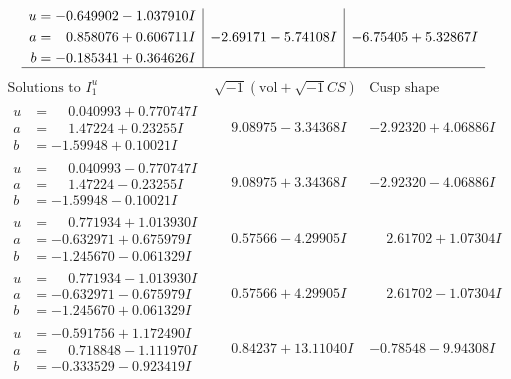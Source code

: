 \documentclass[1p]{elsarticle_modified}
\theoremstyle{definition}
\newcommand{\I}{\sqrt{-1}}
\begin{document}
$$\begin{array}{c|c|c}
\begin{aligned}
u &= -0.649902 - 1.037910 I \\
a &= \phantom{-}0.858076 + 0.606711 I \\
b &= -0.185341 + 0.364626 I\end{aligned}
 & -2.69171 - 5.74108 I & -6.75405 + 5.32867 I\\
 \hline 
 \end{array}$$\newpage$$\begin{array}{c|c|c}  
\text{Solutions to }I^u_{1}& \I (\text{vol} + \sqrt{-1}CS) & \text{Cusp shape}\\
 \hline 
\begin{aligned}
u &= \phantom{-}0.040993 + 0.770747 I \\
a &= \phantom{-}1.47224 + 0.23255 I \\
b &= -1.59948 + 0.10021 I\end{aligned}
 & \phantom{-}9.08975 - 3.34368 I & -2.92320 + 4.06886 I \\ \hline\begin{aligned}
u &= \phantom{-}0.040993 - 0.770747 I \\
a &= \phantom{-}1.47224 - 0.23255 I \\
b &= -1.59948 - 0.10021 I\end{aligned}
 & \phantom{-}9.08975 + 3.34368 I & -2.92320 - 4.06886 I \\ \hline\begin{aligned}
u &= \phantom{-}0.771934 + 1.013930 I \\
a &= -0.632971 + 0.675979 I \\
b &= -1.245670 - 0.061329 I\end{aligned}
 & \phantom{-}0.57566 - 4.29905 I & \phantom{-}2.61702 + 1.07304 I \\ \hline\begin{aligned}
u &= \phantom{-}0.771934 - 1.013930 I \\
a &= -0.632971 - 0.675979 I \\
b &= -1.245670 + 0.061329 I\end{aligned}
 & \phantom{-}0.57566 + 4.29905 I & \phantom{-}2.61702 - 1.07304 I \\ \hline\begin{aligned}
u &= -0.591756 + 1.172490 I \\
a &= \phantom{-}0.718848 - 1.111970 I \\
b &= -0.333529 - 0.923419 I\end{aligned}
 & \phantom{-}0.84237 + 13.11040 I & -0.78548 - 9.94308 I \\ \hline\begin{aligned}

\end{aligned}
\end{array}$$
\end{document}
